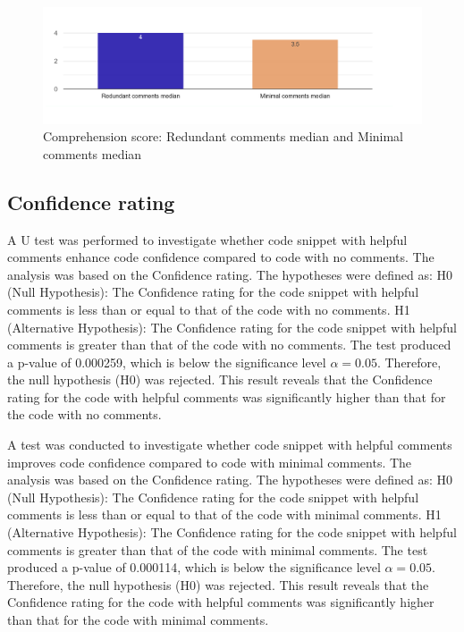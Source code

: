 \begin{figure} [H]
  \centering
  \includegraphics[scale=0.4]{figures/red-min-q3.png}
  \caption{Comprehension score:  Redundant comments median and Minimal comments median}
  \label{fig:AnhangsChor}
\end{figure}


\subsection{Confidence rating}
A U test was performed to investigate whether code snippet with helpful comments enhance code confidence compared to code with no comments. The analysis was based on the Confidence rating. The hypotheses were defined as:  H0 (Null Hypothesis): The Confidence rating for the code snippet with helpful comments is less than or equal to that of the code with no comments.  H1 (Alternative Hypothesis): The Confidence rating for the code snippet with helpful comments is greater than that of the code with no comments. The test produced a p-value of  0.000259, which is below the significance level $\alpha = 0.05$. Therefore, the null hypothesis (H0) was rejected.  This result reveals that the Confidence rating  for the code with helpful comments was significantly higher than that for the code with no comments. 



A test was conducted to investigate whether code snippet with helpful comments improves code confidence compared to code with minimal comments. The analysis was based on the Confidence rating. The hypotheses were defined as:  H0 (Null Hypothesis): The Confidence rating for the code snippet with helpful comments is less than or equal to that of the code with minimal comments.  H1 (Alternative Hypothesis): The Confidence rating for the code snippet with helpful comments is greater than that of the code with minimal comments. The test produced a p-value of  0.000114, which is below the significance level $\alpha = 0.05$. Therefore, the null hypothesis (H0) was rejected.  This result reveals that the Confidence rating  for the code with helpful comments was significantly higher than that for the code with minimal comments.  


